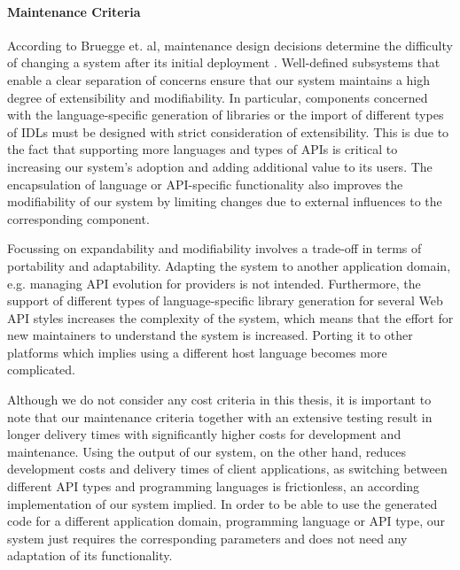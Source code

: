 \paragraph{Maintenance Criteria}
According to Bruegge et. al, maintenance design decisions determine the difficulty of changing a system after its initial deployment \cite{bruegge_object-oriented_2010}. Well-defined subsystems that enable a clear separation of concerns ensure that our system maintains a high degree of extensibility and modifiability. In particular, components concerned with the language-specific generation of libraries or the import of different types of IDLs must be designed with strict consideration of extensibility. This is due to the fact that supporting more languages and types of APIs is critical to increasing our system's adoption and adding additional value to its users. The encapsulation of language or API-specific functionality also improves the modifiability of our system by limiting changes due to external influences to the corresponding component. 

Focussing on expandability and modifiability involves a trade-off in terms of portability and adaptability. Adapting the system to another application domain, e.g. managing API evolution for providers is not intended. Furthermore, the support of different types of language-specific library generation for several Web API styles increases the complexity of the system, which means that the effort for new maintainers to understand the system is increased. Porting it to other platforms which implies using a different host language becomes more complicated. 

Although we do not consider any cost criteria in this thesis, it is important to note that our maintenance criteria together with an extensive testing result in longer delivery times with significantly higher costs for development and maintenance. Using the output of our system, on the other hand, reduces development costs and delivery times of client applications, as switching between different API types and programming languages is frictionless, an according implementation of our system implied. In order to be able to use the generated code for a different application domain, programming language or API type, our system just requires the corresponding parameters and does not need any adaptation of its functionality.


